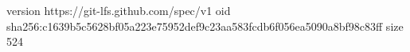 version https://git-lfs.github.com/spec/v1
oid sha256:c1639b5c5628bf05a223e75952def9c23aa583fcdb6f056ea5090a8bf98c83ff
size 524
